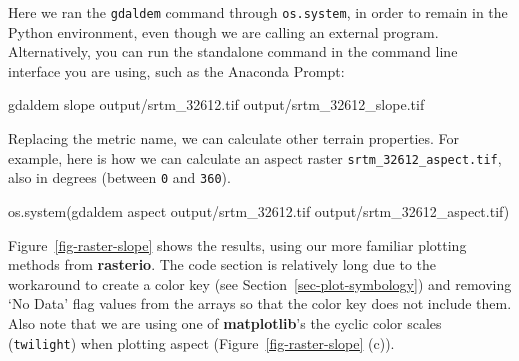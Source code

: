 \documentclass[
  letterpaper,
]{krantz}
\newenvironment{Shaded}{\begin{snugshade}}{\end{snugshade}}
\newcommand{\NormalTok}[1]{\textcolor[rgb]{0.00,0.23,0.31}{#1}}
\newcommand{\StringTok}[1]{\textcolor[rgb]{0.13,0.47,0.30}{#1}}
\begin{document}
Here we ran the \texttt{gdaldem} command through \texttt{os.system}, in
order to remain in the Python environment, even though we are calling an
external program. Alternatively, you can run the standalone command in
the command line interface you are using, such as the Anaconda Prompt:

\begin{Shaded}
\begin{Highlighting}[]
\NormalTok{gdaldem slope output/srtm\_32612.tif output/srtm\_32612\_slope.tif}
\end{Highlighting}
\end{Shaded}

Replacing the metric name, we can calculate other terrain properties.
For example, here is how we can calculate an aspect raster
\texttt{srtm\_32612\_aspect.tif}, also in degrees (between \texttt{0}
and \texttt{360}).

\begin{Shaded}
\begin{Highlighting}[]
\NormalTok{os.system(}\StringTok{\textquotesingle{}gdaldem aspect output/srtm\_32612.tif output/srtm\_32612\_aspect.tif\textquotesingle{}}\NormalTok{)}
\end{Highlighting}
\end{Shaded}

Figure~\ref{fig-raster-slope} shows the results, using our more familiar
plotting methods from \textbf{rasterio}. The code section is relatively
long due to the workaround to create a color key (see
Section~\ref{sec-plot-symbology}) and removing `No Data' flag values
from the arrays so that the color key does not include them. Also note
that we are using one of \textbf{matplotlib}'s the cyclic color scales
(\texttt{\textquotesingle{}twilight\textquotesingle{}}) when plotting
aspect (Figure~\ref{fig-raster-slope} (c)).
\end{document}
